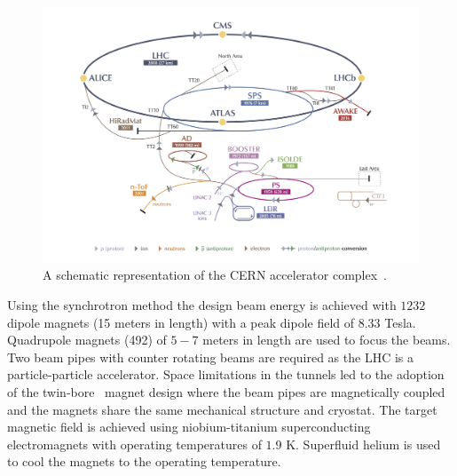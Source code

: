 \begin{figure}[h]
\centering
\includegraphics[width=1.0\columnwidth]{figures_chapter2/cern_complex.jpg}
\caption{A schematic representation of the CERN accelerator complex~\cite{Haffner:1621894}.}
\label{fig:cern}
\end{figure}

Using the synchrotron method the design beam energy is achieved with $1232$ dipole magnets (15 meters in length) with a peak dipole field of $8.33$ Tesla. Quadrupole magnets (492) of $5-7$ meters in length are used to focus the beams. Two beam pipes with counter rotating beams are required as the LHC is a particle-particle accelerator.  Space limitations in the tunnels led to the adoption of the twin-bore~\cite{Blewett:1971zzb} magnet design where the beam pipes are magnetically coupled and the magnets share the same mechanical structure and cryostat. The target magnetic field is achieved using niobium-titanium superconducting electromagnets with operating temperatures of $1.9$ K. Superfluid helium is used to cool the magnets to the operating temperature.   

